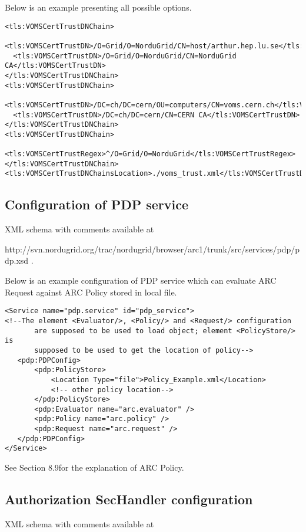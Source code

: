 \documentclass{book}
\begin{document}
Below is an example presenting all possible options.

\begin{verbatim}
<tls:VOMSCertTrustDNChain> 
  <tls:VOMSCertTrustDN>/O=Grid/O=NorduGrid/CN=host/arthur.hep.lu.se</tls:VOMSCertTrustDN>
  <tls:VOMSCertTrustDN>/O=Grid/O=NorduGrid/CN=NorduGrid CA</tls:VOMSCertTrustDN>
</tls:VOMSCertTrustDNChain>
<tls:VOMSCertTrustDNChain>
  <tls:VOMSCertTrustDN>/DC=ch/DC=cern/OU=computers/CN=voms.cern.ch</tls:VOMSCertTrustDN>
  <tls:VOMSCertTrustDN>/DC=ch/DC=cern/CN=CERN CA</tls:VOMSCertTrustDN>
</tls:VOMSCertTrustDNChain>
<tls:VOMSCertTrustDNChain>
  <tls:VOMSCertTrustRegex>^/O=Grid/O=NorduGrid</tls:VOMSCertTrustRegex>
</tls:VOMSCertTrustDNChain>
<tls:VOMSCertTrustDNChainsLocation>./voms_trust.xml</tls:VOMSCertTrustDNChainsLocation>
\end{verbatim}


\subsection{Configuration of PDP service} %
\label{subsec:pdpservice_conf}
XML schema with comments available at 

http://svn.nordugrid.org/trac/nordugrid/browser/arc1/trunk/src/services/pdp/pdp.xsd .

Below is an example configuration of PDP service which can evaluate ARC Request against ARC Policy stored in local file.

\begin{verbatim}
<Service name="pdp.service" id="pdp_service">
<!--The element <Evaluator/>, <Policy/> and <Request/> configuration
       are supposed to be used to load object; element <PolicyStore/> is
       supposed to be used to get the location of policy-->
   <pdp:PDPConfig>
       <pdp:PolicyStore>
           <Location Type="file">Policy_Example.xml</Location>
           <!-- other policy location-->
       </pdp:PolicyStore>
       <pdp:Evaluator name="arc.evaluator" />
       <pdp:Policy name="arc.policy" />
       <pdp:Request name="arc.request" />
   </pdp:PDPConfig>
</Service>
\end{verbatim}

See Section 8.9for the explanation of ARC Policy.


\subsection{Authorization SecHandler configuration} %
\label{subsec:authzhandler_conf}
XML schema with comments available at 
\end{document}
